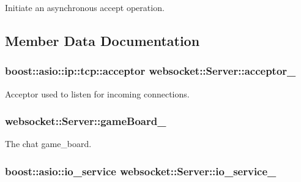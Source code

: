 Initiate an asynchronous accept operation. 



\subsection{Member Data Documentation}
\subsubsection[{\texorpdfstring{acceptor\+\_\+}{acceptor_}}]{\setlength{\rightskip}{0pt plus 5cm}boost\+::asio\+::ip\+::tcp\+::acceptor websocket\+::\+Server\+::acceptor\+\_\+\hspace{0.3cm}{\ttfamily [private]}}\hypertarget{classwebsocket_1_1Server_a377152422807e2f13cc1c6bb18fb416f}{}\label{classwebsocket_1_1Server_a377152422807e2f13cc1c6bb18fb416f}


Acceptor used to listen for incoming connections. 

\subsubsection[{\texorpdfstring{game\+Board\+\_\+}{gameBoard_}}]{ websocket\+::\+Server\+::game\+Board\+\_\+\hspace{0.3cm}{\ttfamily [private]}}\hypertarget{classwebsocket_1_1Server_a412c87233cbe63db77ba955f413c5ef0}{}\label{classwebsocket_1_1Server_a412c87233cbe63db77ba955f413c5ef0}


The chat game\+\_\+board. 

\subsubsection[{\texorpdfstring{io\+\_\+service\+\_\+}{io_service_}}]{\setlength{\rightskip}{0pt plus 5cm}boost\+::asio\+::io\+\_\+service websocket\+::\+Server\+::io\+\_\+service\+\_\+\hspace{0.3cm}{\ttfamily [private]}}\hypertarget{classwebsocket_1_1Server_ab3dc5f36bb4b0913c803915d3191a771}{}\label{classwebsocket_1_1Server_ab3dc5f36bb4b0913c803915d3191a771}


